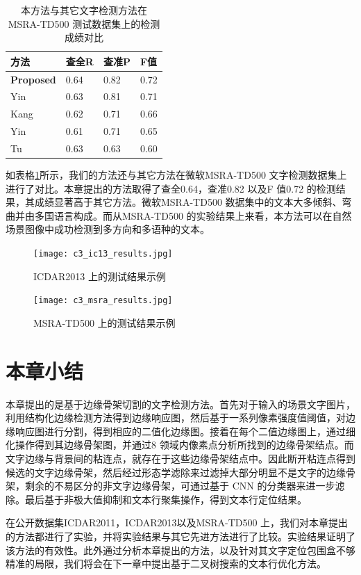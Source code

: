         \begin{table}[!h]
        \centering
        \caption{ 本方法与其它文字检测方法在MSRA-TD500 测试数据集上的检测成绩对比}
        \begin{tabular}{p{}|p{} p{} p{}}
        \hline
        方法 & 查全R & 查准P & F值 \\
        \hline
        \textbf{Proposed} & 0.64 & 0.82 & 0.72 \\
        Yin\cite{Yin2015Multi} & 0.63 & 0.81 & 0.71 \\
        Kang\cite{Kang2014Orientation} & 0.62 & 0.71 & 0.66 \\
        Yin\cite{Yin2013Robust} & 0.61 & 0.71 & 0.65 \\
        Tu\cite{Tu2012Detecting} & 0.63 & 0.63 & 0.60\\
        \hline
        \end{tabular}
        \label{tab.c3_msra}
        \end{table}

        如表格\ref{tab.c3_msra}所示，我们的方法还与其它方法在微软MSRA-TD500 文字检测数据集上进行了对比。本章提出的方法取得了查全0.64，查准0.82 以及F 值0.72 的检测结果，其成绩显著高于其它方法。微软MSRA-TD500 数据集中的文本大多倾斜、弯曲并由多国语言构成。而从MSRA-TD500 的实验结果上来看，本方法可以在自然场景图像中成功检测到多方向和多语种的文本。

        \begin{figure}[!h]
        \centering
        \texttt{[image: c3\_ic13\_results.jpg]}
        \caption{ICDAR2013 上的测试结果示例}
        \label{fig.c3_ic13_results}
        \end{figure}

        \begin{figure}[!h]
        \centering
        \texttt{[image: c3\_msra\_results.jpg]}
        \caption{MSRA-TD500 上的测试结果示例}
        \label{fig.c3_msra_results}
        \end{figure}

    \section{本章小结}

    本章提出的是基于边缘骨架切割的文字检测方法。首先对于输入的场景文字图片，利用结构化边缘检测方法得到边缘响应图，然后基于一系列像素强度值阈值，对边缘响应图进行分割，得到相应的二值化边缘图。接着在每个二值边缘图上，通过细化操作得到其边缘骨架图，并通过8 领域内像素点分析所找到的边缘骨架结点。而文字边缘与背景间的粘连点，就存在于这些边缘骨架结点中。因此断开粘连点得到候选的文字边缘骨架，然后经过形态学滤除来过滤掉大部分明显不是文字的边缘骨架，剩余的不易区分的非文字边缘骨架，可通过基于 CNN 的分类器来进一步滤除。最后基于非极大值抑制和文本行聚集操作，得到文本行定位结果。

    在公开数据集ICDAR2011，ICDAR2013以及MSRA-TD500 上，我们对本章提出的方法都进行了实验，并将实验结果与其它先进方法进行了比较。实验结果证明了该方法的有效性。此外通过分析本章提出的方法，以及针对其文字定位包围盒不够精准的局限，我们将会在下一章中提出基于二叉树搜索的文本行优化方法。


